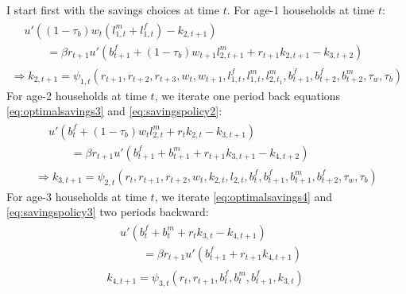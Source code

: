 \documentclass[BufferStockTheory]{subfiles}
\begin{document}
 I start first with the savings choices at time $t.$ For age-1 households at time $t$:
 \begin{subequations}
 \label{eq:savingschoice1t}
 		\begin{gather}
 			\begin{aligned}
 				& u'\left((1-\tau_b)w_t (l_{1,t}^m+l_{1,t}^f) -k_{2,t+1}\right) \\
		&\qquad = \beta r_{t+1}
		u'\left(b_{t+1}^f+(1-\tau_b)w_{t+1} l_{2,t+1}^m + r_{t+1}k_{2,t+1} -k_{3,t+2}\right)
 			\end{aligned}  \label{eq:optimalsavings2t}\\
 	\Rightarrow k_{2,t+1}= \psi_{1,t} (r_{t+1},r_{t+2},r_{t+3},w_t,w_{t+1},l_{1,t}^f,l_{1,t}^m,l_{2,t_1}^m,
 	 b_{t+1}^f,b_{t+2}^f,b_{t+2}^m, \tau_w,\tau_b)\label{eq:savingspolicy1t}
 		\end{gather}
 \end{subequations}
 For age-2 households at time $t$, we iterate one period back equations \eqref{eq:optimalsavings3} and \eqref{eq:savingspolicy2}:
 \begin{subequations}
 	\label{eq:savingschoice2t}
 	\begin{gather}
 	\begin{aligned}
& u'\left(b_{t}^f+(1-\tau_b)w_{t} l_{2,t}^m + r_{t}k_{2,t} -k_{3,t+1}\right) \\
		&\qquad = \beta r_{t+1}
		u'\left(b_{t+1}^f+ b_{t+1}^m  + r_{t+1}k_{3,t+1} -k_{4,t+2}\right)
		\label{eq:optimalsavings3t}
 	\end{aligned}\\
 	\Rightarrow k_{3,t+1}=\psi_{2,t}(r_{t},r_{t+1},r_{t+2},w_{t}, k_{2,t},l_{2,t},b_{t}^f,b_{t+1}^f,b_{t+1}^m,b_{t+2}^f,\tau_w,\tau_b)
 	\label{eq:savingspolicy2t}
 	\end{gather}
 \end{subequations}
 For age-3 households at time $t$, we iterate \eqref{eq:optimalsavings4} and \eqref{eq:savingspolicy3} two periods backward:
  \begin{subequations}
 	\label{eq:savingschoice3t}
 	\begin{gather}
 	\begin{aligned}
&u'\left( b_{t}^f+ b_{t}^m  + r_{t}k_{3,t} -k_{4,t+1}\right)\\
		&\qquad =\beta  r_{t+1} u'\left(b_{t+1}^f + r_{t+1}k_{4,t+1}\right)
		\label{eq:optimalsavings4t}
 	\end{aligned}\\
 k_{4,t+1}=\psi_{3,t}(r_{t},r_{t+1},b_{t}^f, b_{t}^m,b_{t+1}^f,k_{3,t})
 	\label{eq:savingspolicy3t}
 	\end{gather}
 \end{subequations}
\end{document}

